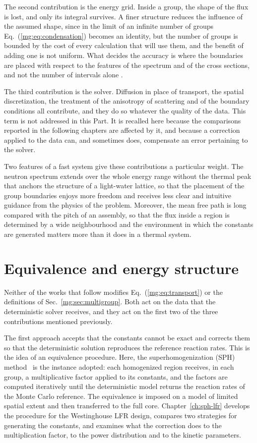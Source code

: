 The second contribution is the energy grid. Inside a group, the shape of the
flux is lost, and only its integral survives. A finer structure reduces the
influence of the assumed shape, since in the limit of an infinite number of
groups Eq.~(\ref{mg:eq:condensation}) becomes an identity, but the number of
groups is bounded by the cost of every calculation that will use them, and the
benefit of adding one is not uniform. What decides the accuracy is where the
boundaries are placed with respect to the features of the spectrum and of the
cross sections,
and not the number of intervals alone \cite{collapsing}.

The third contribution is the solver. Diffusion in place of transport, the
spatial discretization, the treatment of the anisotropy of scattering and of the
boundary conditions all contribute, and they do so whatever the quality of the
data. This term is not addressed in this Part. It is recalled here because the
comparisons reported in the following chapters are affected by it, and because a
correction applied to the data can, and sometimes does, compensate an error
pertaining to the solver.

Two features of a fast system give these contributions a particular weight. The
neutron spectrum extends over the whole energy range without the thermal peak
that anchors the structure of a light-water lattice, so that the placement of the
group boundaries enjoys more freedom and receives less clear and intuitive
guidance from the physics of the problem. Moreover, the mean free path is long
compared with the pitch of an assembly, so that the flux inside a region is
determined by a wide neighbourhood and the environment in which the constants
are generated matters more than it does in a thermal system.

\section{Equivalence and energy structure}\label{mg:sec:approaches}

Neither of the works that follow modifies Eq.~(\ref{mg:eq:transport}) or the
definitions of Sec.~\ref{mg:sec:multigroup}. Both act on the data that the
deterministic solver receives, and they act on the first two of the three
contributions mentioned previously.

The first approach accepts that the constants cannot be exact and corrects them
so that the deterministic solution reproduces the reference reaction rates. This
is the idea of an equivalence procedure. Here, the superhomogenization (SPH)
method~\cite{Hbert_1980} is the instance adopted: each homogenized region receives,
in each group, a multiplicative factor applied to its constants, and the factors
are computed iteratively until the deterministic model returns the reaction
rates of the Monte Carlo reference. The equivalence is imposed on a model of
limited spatial extent and then transferred to the full core.
Chapter~\ref{ch:sph-lfr} develops the procedure for the Westinghouse LFR design,
compares two strategies for generating the constants, and examines what the
correction does to the multiplication factor, to the power distribution and to
the kinetic parameters.

